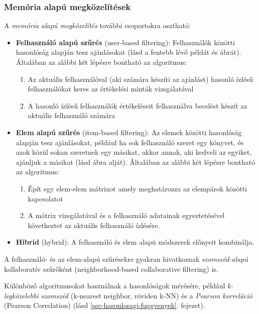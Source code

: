\documentclass[
]{thesis-ekf}
\theoremstyle{definition}
\theoremstyle{remark}
\begin{document}
\subsubsection{Memória alapú megközelítések}
A \emph{memória alapú megközelítés} további csoportokra osztható:
\begin{itemize}
	\item \textbf{Felhasználó alapú szűrés} (user-based filtering): Felhasználók közötti hasonlóság alapján tesz ajánlásokat (lásd a fentebb lévő példát és  ábrát). Általában az alábbi két lépésre bontható az algoritmus:
	\begin{enumerate}
		\item Az aktuális felhasználóval (aki számára készíti az ajánlást) hasonló ízlésű felhasználókat keres az értékelési minták vizsgálatával
		\item A hasonló ízlésű felhasználók értékeléseit felhasználva becslést készít az aktuális felhasználó számára
	\end{enumerate}\cite{wiki-collaborative-filtering}
	\item \textbf{Elem alapú szűrés} (item-based filtering): Az elemek közötti hasonlóság alapján tesz ajánlásokat, például ha sok felhasználó szeret egy könyvet, és azok közül sokan szeretnek egy másikat, akkor annak, aki kedveli az egyiket, ajánljuk a másikat (lásd  ábra alját). Általában az alábbi két lépésre bontható az algoritmus:
	\begin{enumerate}
		\item Épít egy elem-elem mátrixot amely meghatározza az elempárok közötti kapcsolatot
		\item A mátrix vizsgálatával és a felhasználó adatainak egyeztetésével következtet az aktuális felhasználó ízlésére.
	\end{enumerate}\cite{wiki-collaborative-filtering}
	\item \textbf{Hibrid} (hybrid): A felhasználó és elem alapú módszerek előnyeit kombinálja. \cite{hybrid-user-item-based-collaborative-filtering}
\end{itemize}

A felhasználó- és az elem-alapú szűrésekre gyakran hivatkoznak \emph{szomszéd-alapú} kollaboratív szűrőként (neighborhood-based collaborative filtering) is.

Különböző algoritmusokat használnak a hasonlóságok mérésére, például \emph{k-legközelebbi szomszéd} (k-nearest neighbor, röviden k-NN) és a \emph{Pearson korreláció} (Pearson Correlation) (lásd \ref{sec-hasonlosagi-fuggvenyek}. fejezet).\cite{wiki-recommender-system, wiki-collaborative-filtering}
\end{document}
